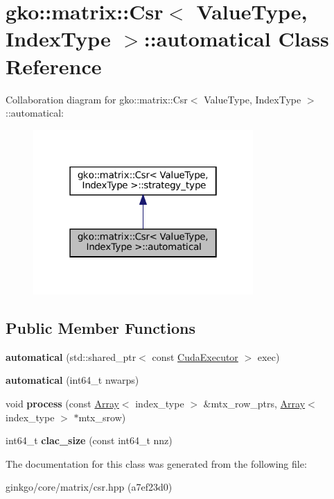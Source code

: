 \hypertarget{classgko_1_1matrix_1_1Csr_1_1automatical}{}\section{gko\+:\+:matrix\+:\+:Csr$<$ Value\+Type, Index\+Type $>$\+:\+:automatical Class Reference}
\label{classgko_1_1matrix_1_1Csr_1_1automatical}


Collaboration diagram for gko\+:\+:matrix\+:\+:Csr$<$ Value\+Type, Index\+Type $>$\+:\+:automatical\+:
\nopagebreak
\begin{figure}[H]
\begin{center}
\leavevmode
\includegraphics[width=238pt]{classgko_1_1matrix_1_1Csr_1_1automatical__coll__graph}
\end{center}
\end{figure}
\subsection*{Public Member Functions}
\begin{DoxyCompactItemize}
\item 
\mbox{\label{classgko_1_1matrix_1_1Csr_1_1automatical_a5e3cff9dc55b22b01ddf3db31731b267}} 
{\bfseries automatical} (std\+::shared\+\_\+ptr$<$ const \hyperlink{classgko_1_1CudaExecutor}{Cuda\+Executor} $>$ exec)
\item 
\mbox{\label{classgko_1_1matrix_1_1Csr_1_1automatical_af69e7b41ae7edd4d89c9a41763eb8ed9}} 
{\bfseries automatical} (int64\+\_\+t nwarps)
\item 
\mbox{\label{classgko_1_1matrix_1_1Csr_1_1automatical_adfc6b9f6bc311a1dedb758009a541741}} 
void {\bfseries process} (const \hyperlink{classgko_1_1Array}{Array}$<$ index\+\_\+type $>$ \&mtx\+\_\+row\+\_\+ptrs, \hyperlink{classgko_1_1Array}{Array}$<$ index\+\_\+type $>$ $\ast$mtx\+\_\+srow)
\item 
\mbox{\label{classgko_1_1matrix_1_1Csr_1_1automatical_af4ea78545a4fbdacfb75951fe3d0a701}} 
int64\+\_\+t {\bfseries clac\+\_\+size} (const int64\+\_\+t nnz)
\end{DoxyCompactItemize}


The documentation for this class was generated from the following file\+:\begin{DoxyCompactItemize}
\item 
ginkgo/core/matrix/csr.\+hpp (a7ef23d0)\end{DoxyCompactItemize}
